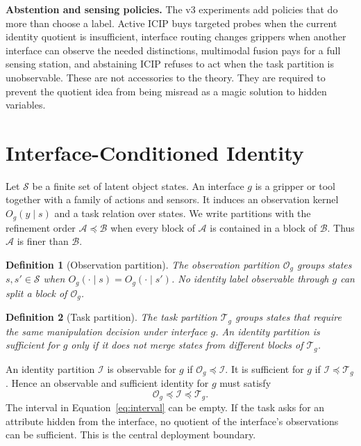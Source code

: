 \documentclass{article}
\newtheorem{definition}{Definition}
\newcommand{\icip}{\textsc{ICIP}}
\newcommand{\states}{\mathcal{S}}
\newcommand{\obs}{\mathcal{O}}
\newcommand{\task}{\mathcal{T}}
\newcommand{\ident}{\mathcal{I}}
\begin{document}
\textbf{Abstention and sensing policies.}
The v3 experiments add policies that do more than choose a label.
Active \icip{} buys targeted probes when the current identity quotient is insufficient, interface routing changes grippers when another interface can observe the needed distinctions, multimodal fusion pays for a full sensing station, and abstaining \icip{} refuses to act when the task partition is unobservable.
These are not accessories to the theory.
They are required to prevent the quotient idea from being misread as a magic solution to hidden variables.

\section{Interface-Conditioned Identity}

Let $\states$ be a finite set of latent object states.
An interface $g$ is a gripper or tool together with a family of actions and sensors.
It induces an observation kernel $O_g(y \mid s)$ and a task relation over states.
We write partitions with the refinement order $\mathcal{A} \preceq \mathcal{B}$ when every block of $\mathcal{A}$ is contained in a block of $\mathcal{B}$.
Thus $\mathcal{A}$ is finer than $\mathcal{B}$.

\begin{definition}[Observation partition]
The observation partition $\obs_g$ groups states $s,s'\in\states$ when $O_g(\cdot\mid s)=O_g(\cdot\mid s')$.
No identity label observable through $g$ can split a block of $\obs_g$.
\end{definition}

\begin{definition}[Task partition]
The task partition $\task_g$ groups states that require the same manipulation decision under interface $g$.
An identity partition is sufficient for $g$ only if it does not merge states from different blocks of $\task_g$.
\end{definition}

An identity partition $\ident$ is observable for $g$ if $\obs_g \preceq \ident$.
It is sufficient for $g$ if $\ident \preceq \task_g$.
Hence an observable and sufficient identity for $g$ must satisfy
\begin{equation}
    \obs_g \preceq \ident \preceq \task_g.
    \label{eq:interval}
\end{equation}
The interval in Equation~\ref{eq:interval} can be empty.
If the task asks for an attribute hidden from the interface, no quotient of the interface's observations can be sufficient.
This is the central deployment boundary.
\end{document}
